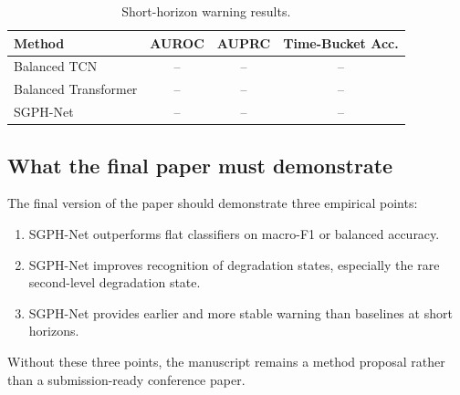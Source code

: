 \begin{table}[t]
\centering
\caption{Short-horizon warning results.}
\label{tab:warning_results}
\begin{tabular}{lccc}
\toprule
Method & AUROC & AUPRC & Time-Bucket Acc. \\
\midrule
Balanced TCN & -- & -- & -- \\
Balanced Transformer & -- & -- & -- \\
SGPH-Net & -- & -- & -- \\
\bottomrule
\end{tabular}
\end{table}

\subsection{What the final paper must demonstrate}

The final version of the paper should demonstrate three empirical points:
\begin{enumerate}
\item SGPH-Net outperforms flat classifiers on macro-F1 or balanced accuracy.
\item SGPH-Net improves recognition of degradation states, especially the rare second-level degradation state.
\item SGPH-Net provides earlier and more stable warning than baselines at short horizons.
\end{enumerate}

Without these three points, the manuscript remains a method proposal rather than a submission-ready conference paper.

